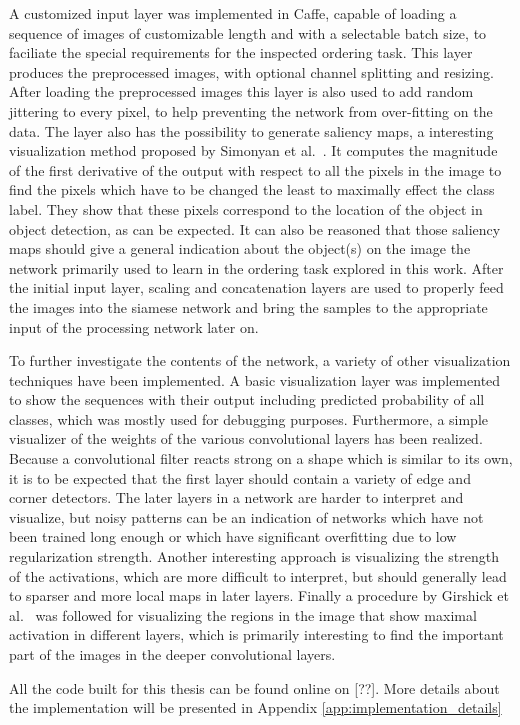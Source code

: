 A customized input layer was implemented in Caffe, capable of loading a sequence of images of customizable length and with a selectable batch size, to faciliate the special requirements for the inspected ordering task. This layer produces the preprocessed images, with optional channel splitting and resizing. After loading the preprocessed images this layer is also used to add random jittering to every pixel, to help preventing the network from over-fitting on the data. The layer also has the possibility to generate saliency maps, a interesting visualization method proposed by Simonyan et al.~\cite{simonyan2013}. It computes the magnitude of the first derivative of the output with respect to all the pixels in the image to find the pixels which have to be changed the least to maximally effect the class label. They show that these pixels correspond to the location of the object in object detection, as can be expected. It can also be reasoned that those saliency maps should give a general indication about the object(s) on the image the network primarily used to learn in the ordering task explored in this work. After the initial input layer, scaling and concatenation layers are used to properly feed the images into the siamese network and bring the samples to the appropriate input of the processing network later on.

To further investigate the contents of the network, a variety of other visualization techniques have been implemented. A basic visualization layer was implemented to show the sequences with their output including predicted probability of all classes, which was mostly used for debugging purposes. Furthermore, a simple visualizer of the weights of the various convolutional layers has been realized. Because a convolutional filter reacts strong on a shape which is similar to its own, it is to be expected that the first layer should contain a variety of edge and corner detectors. The later layers in a network are harder to interpret and visualize, but noisy patterns can be an indication of networks which have not been trained long enough or which have significant overfitting due to low regularization strength. Another interesting approach is visualizing the strength of the activations, which are more difficult to interpret, but should generally lead to sparser and more local maps in later layers. Finally a procedure by Girshick et al.~\cite{girshick2014} was followed for visualizing the regions in the image that show maximal activation in different layers, which is primarily interesting to find the important part of the images in the deeper convolutional layers.

All the code built for this thesis can be found online on [??].  More details about the implementation will be presented in Appendix \ref{app:implementation_details}
